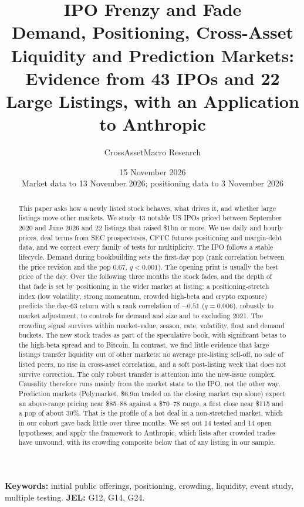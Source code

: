 \documentclass[11pt]{article}
\title{\vspace{-1.2em}\textbf{IPO Frenzy and Fade}\\[0.3em]
\large Demand, Positioning, Cross-Asset Liquidity and Prediction Markets:\\ Evidence from 43 IPOs and 22 Large Listings, with an Application to Anthropic}
\author{CrossAssetMacro Research}
\date{15 November 2026\\[0.2em]\small Market data to 13 November 2026; positioning data to 3 November 2026}
\begin{document}
\maketitle
\thispagestyle{fancy}

\begin{abstract}
\noindent This paper asks how a newly listed stock behaves, what drives it, and whether large listings move other markets. We study 43 notable US IPOs priced between September 2020 and June 2026 and 22 listings that raised \$1bn or more. We use daily and hourly prices, deal terms from SEC prospectuses, CFTC futures positioning and margin-debt data, and we correct every family of tests for multiplicity. The IPO follows a stable lifecycle. Demand during bookbuilding sets the first-day pop (rank correlation between the price revision and the pop 0.67, $q<0.001$). The opening print is usually the best price of the day. Over the following three months the stock fades, and the depth of that fade is set by positioning in the wider market at listing: a positioning-stretch index (low volatility, strong momentum, crowded high-beta and crypto exposure) predicts the day-63 return with a rank correlation of $-0.51$ ($q=0.006$), robustly to market adjustment, to controls for demand and size and to excluding 2021. The crowding signal survives within market-value, season, rate, volatility, float and demand buckets. The new stock trades as part of the speculative book, with significant betas to the high-beta spread and to Bitcoin. In contrast, we find little evidence that large listings transfer liquidity out of other markets: no average pre-listing sell-off, no sale of listed peers, no rise in cross-asset correlation, and a soft post-listing week that does not survive correction. The only robust transfer is attention into the new-issue complex. Causality therefore runs mainly from the market state to the IPO, not the other way. Prediction markets (Polymarket, \$6.9m traded on the closing market cap alone) expect an above-range pricing near \$85--88 against a \$70--78 range, a first close near \$115 and a pop of about 30\%. That is the profile of a hot deal in a non-stretched market, which in our cohort gave back little over three months. We set out 14 tested and 14 open hypotheses, and apply the framework to Anthropic, which lists after crowded trades have unwound, with its crowding composite below that of any listing in our sample.
\end{abstract}

\noindent\textbf{Keywords:} initial public offerings, positioning, crowding, liquidity, event study, multiple testing.\quad
\textbf{JEL:} G12, G14, G24.
\end{document}
